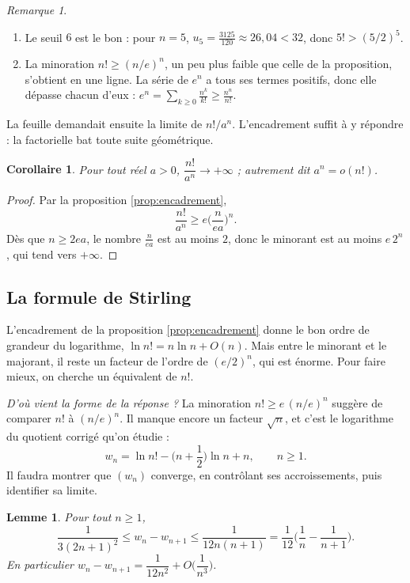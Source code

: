 \documentclass[11pt,a4paper]{article}
\theoremstyle{plain}
\newtheorem{lemme}[theoreme]{Lemme}
\newtheorem{corollaire}[theoreme]{Corollaire}
\theoremstyle{definition}
\theoremstyle{remark}
\newtheorem{remarque}[theoreme]{Remarque}
\begin{document}
\begin{remarque}
\begin{enumerate}[nosep]
\item Le seuil $6$ est le bon : pour $n=5$, $u_5=\frac{3125}{120}\approx26{,}04<32$, donc $5!>(5/2)^5$.
\item La minoration $n!\geq(n/e)^n$, un peu plus faible que celle de la proposition, s'obtient en une ligne. La série de $e^n$ a tous ses termes positifs, donc elle dépasse chacun d'eux : $e^n=\sum_{k\geq0}\frac{n^k}{k!}\geq\frac{n^n}{n!}$.
\end{enumerate}
\end{remarque}

La feuille demandait ensuite la limite de $n!/a^n$. L'encadrement suffit à y répondre : la factorielle bat toute suite géométrique.

\begin{corollaire}\label{cor:croissances}
Pour tout réel $a>0$, $\dfrac{n!}{a^n}\to+\infty$ ; autrement dit $a^n=o(n!)$.
\end{corollaire}

\begin{proof}
Par la proposition \ref{prop:encadrement},
\[
  \frac{n!}{a^n}\geq e\Big(\frac{n}{ea}\Big)^n .
\]
Dès que $n\geq2ea$, le nombre $\frac{n}{ea}$ est au moins $2$, donc le minorant est au moins $e\,2^n$, qui tend vers $+\infty$.
\end{proof}

\subsection{La formule de Stirling}

L'encadrement de la proposition \ref{prop:encadrement} donne le bon ordre de grandeur du logarithme, $\ln n!=n\ln n+O(n)$. Mais entre le minorant et le majorant, il reste un facteur de l'ordre de $(e/2)^n$, qui est énorme. Pour faire mieux, on cherche un équivalent de $n!$.

\emph{D'où vient la forme de la réponse ?} La minoration $n!\geq e\,(n/e)^n$ suggère de comparer $n!$ à $(n/e)^n$. Il manque encore un facteur $\sqrt n$, et c'est le logarithme du quotient corrigé qu'on étudie :
\[
  w_n=\ln n!-\Big(n+\frac12\Big)\ln n+n,\qquad n\geq1 .
\]
Il faudra montrer que $(w_n)$ converge, en contrôlant ses accroissements, puis identifier sa limite.

\begin{lemme}\label{lem:wn}
Pour tout $n\geq1$,
\[
  \frac1{3(2n+1)^2}\leq w_n-w_{n+1}\leq\frac1{12n(n+1)}=\frac1{12}\Big(\frac1n-\frac1{n+1}\Big).
\]
En particulier $w_n-w_{n+1}=\dfrac1{12n^2}+O\Big(\dfrac1{n^3}\Big)$.
\end{lemme}
\end{document}
